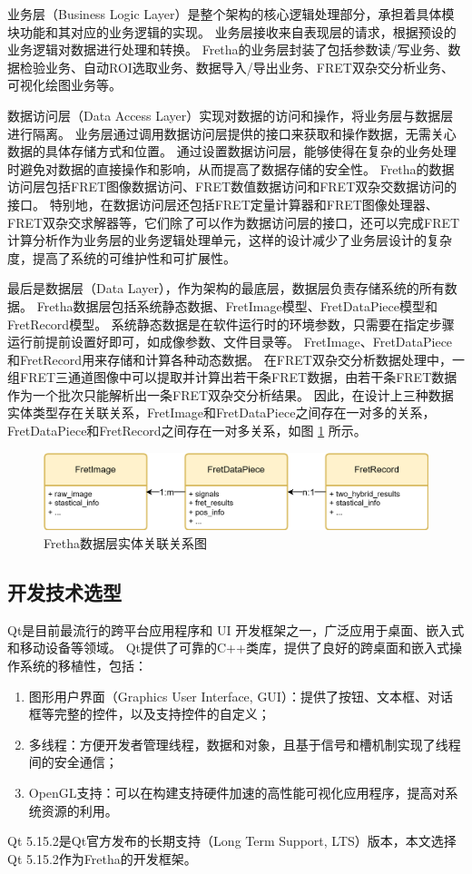 业务层（Business Logic Layer）是整个架构的核心逻辑处理部分，承担着具体模块功能和其对应的业务逻辑的实现。
业务层接收来自表现层的请求，根据预设的业务逻辑对数据进行处理和转换。
Fretha的业务层封装了包括参数读/写业务、数据检验业务、自动ROI选取业务、数据导入/导出业务、FRET双杂交分析业务、可视化绘图业务等。

数据访问层（Data Access Layer）实现对数据的访问和操作，将业务层与数据层进行隔离。
业务层通过调用数据访问层提供的接口来获取和操作数据，无需关心数据的具体存储方式和位置。
通过设置数据访问层，能够使得在复杂的业务处理时避免对数据的直接操作和影响，从而提高了数据存储的安全性。
Fretha的数据访问层包括FRET图像数据访问、FRET数值数据访问和FRET双杂交数据访问的接口。
特别地，在数据访问层还包括FRET定量计算器和FRET图像处理器、FRET双杂交求解器等，它们除了可以作为数据访问层的接口，还可以完成FRET计算分析作为业务层的业务逻辑处理单元，这样的设计减少了业务层设计的复杂度，提高了系统的可维护性和可扩展性。

最后是数据层（Data Layer），作为架构的最底层，数据层负责存储系统的所有数据。
Fretha数据层包括系统静态数据、FretImage模型、FretDataPiece模型和FretRecord模型。
系统静态数据是在软件运行时的环境参数，只需要在指定步骤运行前提前设置好即可，如成像参数、文件目录等。
FretImage、FretDataPiece和FretRecord用来存储和计算各种动态数据。
在FRET双杂交分析数据处理中，一组FRET三通道图像中可以提取并计算出若干条FRET数据，由若干条FRET数据作为一个批次只能解析出一条FRET双杂交分析结果。
因此，在设计上三种数据实体类型存在关联关系，FretImage和FretDataPiece之间存在一对多的关系，FretDataPiece和FretRecord之间存在一对多关系，如图 \ref{fig:fretha_data_relations} 所示。
\begin{figure}[hbtp]
    \centering
    \includegraphics[width=1\linewidth]{../figures/2/2_Fretha数据层对应关系.png}
    \caption{Fretha数据层实体关联关系图}
    \label{fig:fretha_data_relations}
\end{figure}

\subsection{开发技术选型}
\ifshowtext
Qt是目前最流行的跨平台应用程序和 UI 开发框架之一，广泛应用于桌面、嵌入式和移动设备等领域。
Qt提供了可靠的C++类库，提供了良好的跨桌面和嵌入式操作系统的移植性，包括：
\begin{enumerate}
  \item 图形用户界面（Graphics User Interface, GUI）：提供了按钮、文本框、对话框等完整的控件，以及支持控件的自定义；
  \item 多线程：方便开发者管理线程，数据和对象，且基于信号和槽机制实现了线程间的安全通信；
  \item OpenGL支持：可以在构建支持硬件加速的高性能可视化应用程序，提高对系统资源的利用。
\end{enumerate}
Qt 5.15.2是Qt官方发布的长期支持（Long Term Support, LTS）版本，本文选择Qt 5.15.2作为Fretha的开发框架。

